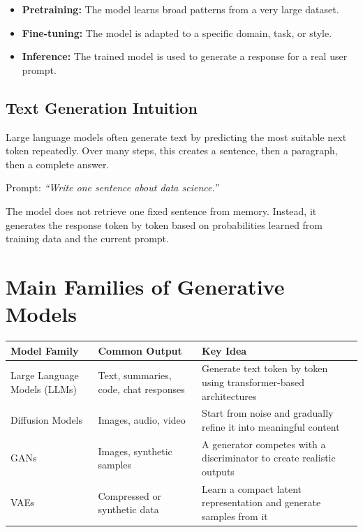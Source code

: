 \documentclass[11pt,a4paper]{article}
\begin{document}
\begin{itemize}[leftmargin=*]
  \item \textbf{Pretraining:} The model learns broad patterns from a very large dataset.
  \item \textbf{Fine-tuning:} The model is adapted to a specific domain, task, or style.
  \item \textbf{Inference:} The trained model is used to generate a response for a real user prompt.
\end{itemize}

\subsection{Text Generation Intuition}

\begin{definitionbox}
Large language models often generate text by predicting the most suitable next token repeatedly. Over many steps, this creates a sentence, then a paragraph, then a complete answer.
\end{definitionbox}

\begin{examplebox}
Prompt: \textit{``Write one sentence about data science.''}

The model does not retrieve one fixed sentence from memory. Instead, it generates the response token by token based on probabilities learned from training data and the current prompt.
\end{examplebox}

\section{Main Families of Generative Models}

\begin{longtable}{@{}p{3.2cm}p{3.2cm}p{6.3cm}@{}}
\toprule
\rowcolor{primary!15}
\textbf{Model Family} & \textbf{Common Output} & \textbf{Key Idea} \\
\midrule
\endhead
Large Language Models (LLMs) & Text, summaries, code, chat responses & Generate text token by token using transformer-based architectures \\
\addlinespace
Diffusion Models & Images, audio, video & Start from noise and gradually refine it into meaningful content \\
\addlinespace
GANs & Images, synthetic samples & A generator competes with a discriminator to create realistic outputs \\
\addlinespace
VAEs & Compressed or synthetic data & Learn a compact latent representation and generate samples from it \\
\bottomrule
\end{longtable}
\end{document}
